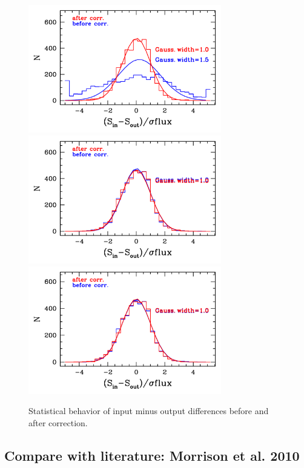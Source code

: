 \documentclass[11pt,a4paper]{article}
\begin{document}
\begin{figure}[H]
	\includegraphics[width=0.75\textwidth]{galsim_20cm_Glenn_hist_dfcorr_1}
	\includegraphics[width=0.75\textwidth]{galsim_20cm_Glenn_hist_dfcorr_2}
	\includegraphics[width=0.75\textwidth]{galsim_20cm_Glenn_hist_dfcorr_3}
	\caption{\label{galsim_20cm_Glenn_hist}
		Statistical behavior of input minus output differences before and after correction.}
\end{figure}

\subsection{Compare with literature: Morrison et al. 2010}
\end{document}
